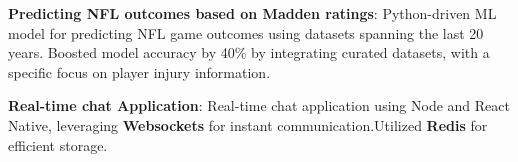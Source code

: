\documentclass[a4paper,20pt]{article}
\makeatletter
\newcommand{\resumeItem}[2]{
  \item\small{
    \textbf{#1}{: #2 \vspace{-2pt}}
  }
}
\newcommand{\resumeSubheading}[4]{
  \vspace{-1pt}\item
    \begin{tabular*}{0.97\textwidth}{l@{\extracolsep{\fill}}r}
      \textbf{#1} & #2 \\
      {#3} & {#4} \\
    \end{tabular*}\vspace{-5pt}
}
\newcommand{\resumeSubItem}[2]{\resumeItem{#1}{#2}\vspace{-1pt}}
\makeatother
\begin{document}
\resumeSubItem{Predicting NFL outcomes based on Madden ratings}{Python-driven ML model for predicting NFL game outcomes using datasets spanning the last 20 years. Boosted model accuracy by 40\% by integrating curated datasets, with a specific focus on player injury information.}

\resumeSubItem{Real-time chat Application}{Real-time chat application using Node and React Native, leveraging \textbf{Websockets} for instant communication.Utilized \textbf{Redis} for efficient storage. }







  
    
    
	    
\end{document}
